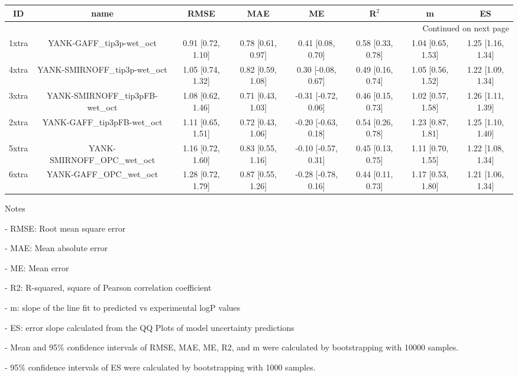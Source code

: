 \documentclass{article}
\begin{document}
\begin{center}
\begin{longtable}{|cccccccc|}
\toprule
    ID &                             name &               RMSE &                MAE &                   ME &              R$^2$ &                  m &                 ES \\
\midrule
\endhead
\midrule
\multicolumn{8}{r}{{Continued on next page}} \\
\midrule
\endfoot

\bottomrule
\endlastfoot
 1xtra &        YANK-GAFF\_tip3p-wet\_oct &  0.91 [0.72, 1.10] &  0.78 [0.61, 0.97] &    0.41 [0.08, 0.70] &  0.58 [0.33, 0.78] &  1.04 [0.65, 1.53] &  1.25 [1.16, 1.34] \\
 4xtra &    YANK-SMIRNOFF\_tip3p-wet\_oct &  1.05 [0.74, 1.32] &  0.82 [0.59, 1.08] &   0.30 [-0.08, 0.67] &  0.49 [0.16, 0.74] &  1.05 [0.56, 1.52] &  1.22 [1.09, 1.34] \\
 3xtra &  YANK-SMIRNOFF\_tip3pFB-wet\_oct &  1.08 [0.62, 1.46] &  0.71 [0.43, 1.03] &  -0.31 [-0.72, 0.06] &  0.46 [0.15, 0.73] &  1.02 [0.57, 1.58] &  1.26 [1.11, 1.39] \\
 2xtra &      YANK-GAFF\_tip3pFB-wet\_oct &  1.11 [0.65, 1.51] &  0.72 [0.43, 1.06] &  -0.20 [-0.63, 0.18] &  0.54 [0.26, 0.78] &  1.23 [0.87, 1.81] &  1.25 [1.10, 1.40] \\
 5xtra &     YANK-SMIRNOFF\_OPC\_wet\_oct &  1.16 [0.72, 1.60] &  0.83 [0.55, 1.16] &  -0.10 [-0.57, 0.31] &  0.45 [0.13, 0.75] &  1.11 [0.70, 1.55] &  1.22 [1.08, 1.34] \\
 6xtra &         YANK-GAFF\_OPC\_wet\_oct &  1.28 [0.72, 1.79] &  0.87 [0.55, 1.26] &  -0.28 [-0.78, 0.16] &  0.44 [0.11, 0.73] &  1.17 [0.53, 1.80] &  1.21 [1.06, 1.34] \\
\end{longtable}
\end{center}

Notes

- RMSE: Root mean square error

- MAE: Mean absolute error

- ME: Mean error

- R2: R-squared, square of Pearson correlation coefficient

- m: slope of the line fit to predicted vs experimental logP values

- ES: error slope calculated from the QQ Plots of model uncertainty predictions

- Mean and 95\% confidence intervals of RMSE, MAE, ME, R2, and m were calculated by bootstrapping with 10000 samples.

- 95\% confidence intervals of ES were calculated by bootstrapping with 1000 samples.\end{document}
\end{document}
